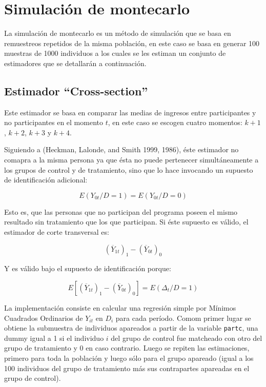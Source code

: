 \documentclass[]{article}
\begin{document}
\section{Simulación de montecarlo}\label{simulacion-de-montecarlo}

La simulación de montecarlo es un método de simulación que se basa en
remuestreos repetidos de la misma población, en este caso se basa en
generar 100 muestras de 1000 individuos a los cuales se les estiman un
conjunto de estimadores que se detallarán a continuación.

\subsection{Estimador ``Cross-section''}\label{estimador-cross-section}

Este estimador se basa en comparar las medias de ingresos entre
participantes y no participantes en el momento $t$, en este caso se
escogen cuatro momentos: $k+1$, $k+2$, $k+3$ y $k+4$.

Siguiendo a (Heckman, Lalonde, and Smith 1999, 1986), éste estimador no
comapra a la misma persona ya que ésta no puede pertenecer
simultáneamente a los grupos de control y de tratamiento, sino que lo
hace invocando un supuesto de identificación adicional:

\[ E(Y_{0t}/D=1)=E(Y_{0t}/D=0) \]

Esto es, que las personas que no participan del programa poseen el mismo
resultado sin tratamiento que los que participan. Si éste supuesto es
válido, el estimador de corte transversal es:

\[ \left(\overline{Y}_{1t}\right)_{1}-\left(\overline{Y}_{0t}\right)_{0} \]

Y es válido bajo el supuesto de identificación porque:

\[ E\left[\left(\overline{Y}_{1t}\right)_{1}-\left(\overline{Y}_{0t}\right)_{0}\right]=E(\Delta_{t}/D=1) \]

La implementación consiste en calcular una regresión simple por Mínimos
Cuadrados Ordinarios de $Y_{it}$ en $D_{i}$ para cada período. Comom
primer lugar se obtiene la submuestra de individuos apareados a partir
de la variable \texttt{partc}, una dummy igual a 1 si el individuo $i$
del grupo de control fue matcheado con otro del grupo de tratamiento y 0
en caso contrario. Luego se repiten las estimaciones, primero para toda
la población y luego sólo para el grupo apareado (igual a los 100
individuos del grupo de tratamiento más sus contrapartes apareadas en el
grupo de control).
\end{document}

